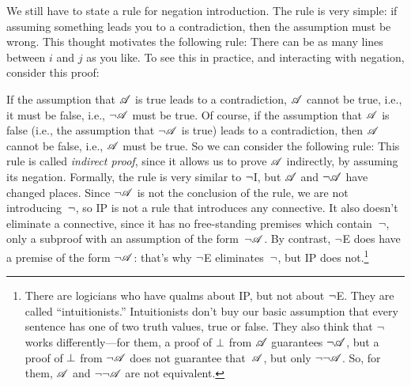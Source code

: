 We still have to state a rule for negation introduction. The rule is very simple: if assuming something leads you to a contradiction, then the assumption must be wrong. This thought motivates the following rule:
There can be as many lines between $i$ and $j$ as you like. To see this in practice, and interacting with negation, consider this proof:
	\begin{fitchproof}
		\AS
		\open
			\AS
		\close
	\end{fitchproof}

If the assumption that $\mathscr{A}$ is true leads to a contradiction, $\mathscr{A}$ cannot be true, i.e., it must be false, i.e., $\neg\mathscr{A}$ must be true. Of course, if the assumption that $\mathscr{A}$ is false (i.e., the assumption that $\neg\mathscr{A}$ is true) leads to a contradiction, then $\mathscr{A}$ cannot be false, i.e., $\mathscr{A}$ must be true. So we can consider the following rule:
This rule is called \emph{indirect proof}, since it allows us to prove $\mathscr{A}$ indirectly, by assuming its negation. Formally, the rule is very similar to $\neg$I, but $\mathscr{A}$ and $\neg\mathscr{A}$ have changed places. Since $\neg\mathscr{A}$ is not the conclusion of the rule, we are not introducing~$\neg$, so IP is not a rule that introduces any connective. It also doesn't eliminate a connective, since it has no free-standing premises which contain~$\neg$, only a subproof with an assumption of the form~$\neg\mathscr{A}$. By contrast, $\neg$E does have a premise of the form $\neg\mathscr{A}$: that's why $\neg$E eliminates~$\neg$, but IP does not.\footnote{There are logicians who have qualms about IP, but not about $\neg$E. They are called ``intuitionists.'' Intuitionists don't buy our basic assumption that every sentence has one of two truth values, true or false. They also think that $\neg$ works differently---for them, a proof of $\bot$ from $\mathscr{A}$ guarantees $\neg \mathscr{A}$, but a proof of $\bot$ from $\neg\mathscr{A}$ does not guarantee that~$\mathscr{A}$, but only $\neg\neg\mathscr{A}$. So, for them, $\mathscr{A}$ and $\neg\neg\mathscr{A}$ are not equivalent.}

